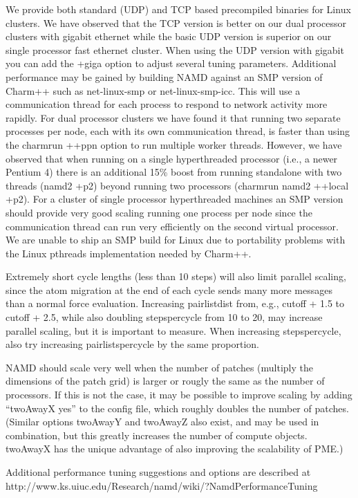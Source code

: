 We provide both standard (UDP) and TCP based precompiled binaries
for Linux clusters.  We have observed that the TCP version is better
on our dual processor clusters with gigabit ethernet while the basic
UDP version is superior on our single processor fast ethernet cluster.
When using the UDP version with gigabit you can add the +giga option
to adjust several tuning parameters.  Additional performance may be
gained by building NAMD against an SMP version of Charm++ such as
net-linux-smp or net-linux-smp-icc.  This will use a communication
thread for each process to respond to network activity more rapidly.
For dual processor clusters we have found it that running two separate
processes per node, each with its own communication thread, is faster
than using the charmrun ++ppn option to run multiple worker threads.
However, we have observed that when running on a single hyperthreaded
processor (i.e., a newer Pentium 4) there is an additional 15\% boost
from running standalone with two threads (namd2 +p2) beyond running
two processors (charmrun namd2 ++local +p2).  For a cluster of single
processor hyperthreaded machines an SMP version should provide very
good scaling running one process per node since the communication
thread can run very efficiently on the second virtual processor.  We
are unable to ship an SMP build for Linux due to portability problems
with the Linux pthreads implementation needed by Charm++.

Extremely short cycle lengths (less than 10 steps) will also limit
parallel scaling, since the atom migration at the end of each cycle
sends many more messages than a normal force evaluation.  Increasing
pairlistdist from, e.g., cutoff + 1.5 to cutoff + 2.5, while also
doubling stepspercycle from 10 to 20, may increase parallel scaling,
but it is important to measure.  When increasing stepspercycle, also
try increasing pairlistspercycle by the same proportion.

NAMD should scale very well when the number of patches (multiply the
dimensions of the patch grid) is larger or rougly the same as the
number of processors.  If this is not the case, it may be possible
to improve scaling by adding ``twoAwayX yes'' to the config file,
which roughly doubles the number of patches.  (Similar options
twoAwayY and twoAwayZ also exist, and may be used in combination,
but this greatly increases the number of compute objects.  twoAwayX
has the unique advantage of also improving the scalability of PME.)
  

Additional performance tuning suggestions and options are described
at http://www.ks.uiuc.edu/Research/namd/wiki/?NamdPerformanceTuning

